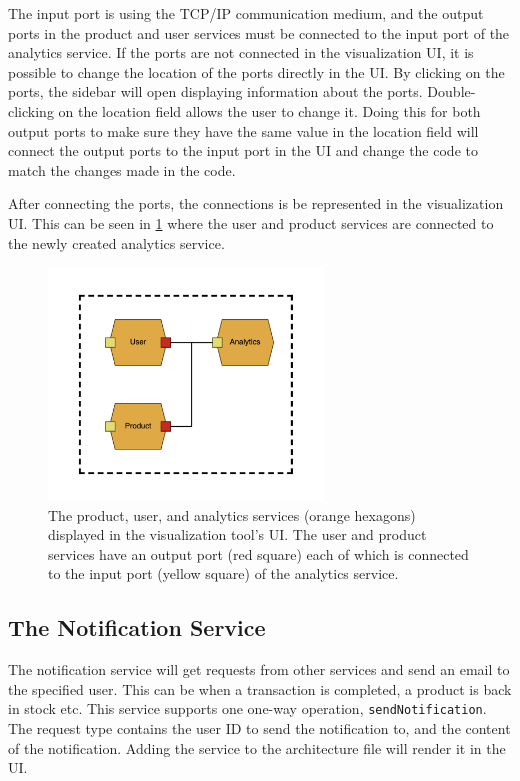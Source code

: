 The input port is using the TCP/IP communication medium, and the output ports in the product and user services must be connected to the input port of the analytics service.
If the ports are not connected in the visualization UI, it is possible to change the location of the ports directly in the UI.
By clicking on the ports, the sidebar will open displaying information about the ports. Double-clicking on the location field allows the user to change it.
Doing this for both output ports to make sure they have the same value in the location field will connect the output ports to the input port in the UI and change the code to match the changes made in the code.

After connecting the ports, the connections is be represented in the visualization UI. This can be seen in \cref{figure:jv_analytics} where the user and product services are connected to the newly created analytics service.

\begin{figure}[t]
    \center
    \includegraphics[width=0.65\textwidth]{figures/jv_analytics.png}
    \caption{The product, user, and analytics services (orange hexagons) displayed in the visualization tool's UI. The user and product services have an output port (red square) each of which is connected to the input port (yellow square) of the analytics service.}
    \label{figure:jv_analytics}
\end{figure}

\subsection{The Notification Service}
The notification service will get requests from other services and send an email to the specified user. This can be when a transaction is completed, a product is back in stock etc.
This service supports one one-way operation, \texttt{sendNotification}. The request type contains the user ID to send the notification to, and the content of the notification.
Adding the service to the architecture file will render it in the UI.


